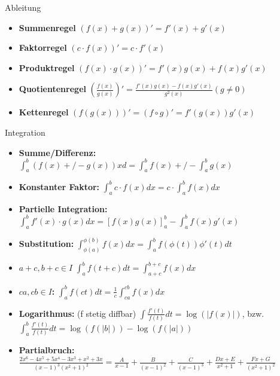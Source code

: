 \begin{Rechenregeln}{Ableitung}{}
    \begin{itemize}
        \item \textbf{Summenregel} $(f(x)+g(x))' = f'(x) + g'(x)$
        \item \textbf{Faktorregel} $(c\cdot f(x))' = c\cdot f'(x)$
        \item \textbf{Produktregel} $(f(x)\cdot g(x))' = f'(x)g(x) + f(x)g'(x)$
        \item \textbf{Quotientenregel} $\left(\frac{f(x)}{g(x)}\right)' = \frac{f'(x)g(x) - f(x)g'(x)}{g^2(x)}(g\neq 0)$
        \item \textbf{Kettenregel} $(f(g(x)))' = (f\circ g)' = f'(g(x))g'(x)$
    \end{itemize}
\end{Rechenregeln}

\begin{Rechenregeln}{Integration}{}
    \begin{itemize}
    \item \textbf{Summe/Differenz:} $\int_a^b (f(x) +/- g(x)) xd = \int_a^b f(x) +/- \int_a^b g(x)$
    \item \textbf{Konstanter Faktor:} $\int_a^b c\cdot f(x)dx = c\cdot \int_a^b f(x)dx$
    \item \textbf{Partielle Integration:} $\int_a^b f'(x)\cdot g(x)dx = \left[f(x)g(x)\right]_a^b - \int_a^b f(x)g'(x)$
    \item \textbf{Substitution:} $\int_{\phi(a)}^{\phi(b)} f(x)dx = \int_a^b f(\phi(t))\phi '(t) dt$
    \item \textbf{$a+c, b+c \in I$} $\int_a^b f(t+c)dt = \int_{a+c}^{b+c} f(x)dx$
    \item \textbf{$ca,cb\in I$: } $\int_a^b f(ct)dt = \frac{1}{c}\int_{ca}^{cb} f(x)dx$
    \item \textbf{Logarithmus: }\;(f stetig diffbar) $\int\frac{f'(t)}{f(t)}dt = \log(|f(x)|)$, bzw. $\int_a^b\frac{f'(t)}{f(t)}dt = \log(f(|b|)) - \log(f(|a|))$
    \item \textbf{Partialbruch: }\\
     $\frac{2x^6-4x^5+5x^4-3x^3+x^2+3x}{(x-1)^3(x^2+1)^2} = \frac{A}{x-1}+\frac{B}{(x-1)^2}+\frac{C}{(x-1)^3}+\frac{Dx+E}{x^2+1}+\frac{Fx+G}{(x^2+1)^2}$
    \end{itemize}
\end{Rechenregeln}


